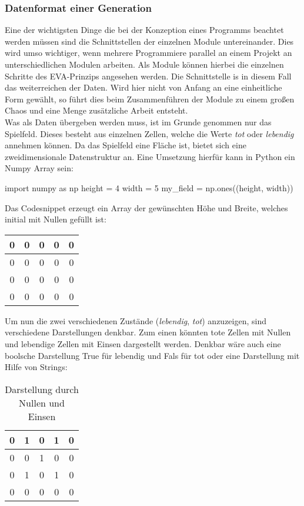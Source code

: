 \subsubsection{Datenformat einer Generation} \label{sec:Datenformat}
Eine der wichtigsten Dinge die bei der Konzeption eines Programms beachtet werden müssen sind die Schnittstellen der einzelnen Module untereinander. Dies wird umso wichtiger, wenn mehrere Programmiere parallel an einem Projekt an unterschiedlichen Modulen arbeiten. Als Module können hierbei die einzelnen Schritte des EVA-Prinzips angesehen werden. Die Schnittstelle is in diesem Fall das weiterreichen der Daten. Wird hier nicht von Anfang an eine einheitliche Form gewählt, so führt dies beim Zusammenführen der Module zu einem großen Chaos und eine Menge zusätzliche Arbeit entsteht.\\
Was als Daten übergeben werden muss, ist im Grunde genommen nur das Spielfeld. Dieses besteht aus einzelnen Zellen, welche die Werte \textit{tot} oder \textit{lebendig} annehmen können.  Da das Spielfeld eine Fläche ist, bietet sich eine zweidimensionale Datenstruktur an. Eine Umsetzung hierfür kann in Python ein Numpy Array sein:
\begin{python}
import numpy as np
height = 4
width = 5
my_field = np.ones((height, width))
\end{python}
Das Codesnippet erzeugt ein Array der gewünschten Höhe und Breite, welches initial mit Nullen gefüllt ist:
\begin{table}[H]
	\center
	\begin{tabular}{|c|c|c|c|c|}
		\hline
		0  & 0& 0 & 0 & 0 \\ \hline
		0  & 0& 0 & 0 & 0\\ \hline
		0  & 0& 0 & 0 & 0\\ \hline
		0  & 0& 0 & 0 & 0\\ \hline
	\end{tabular}
\end{table}
Um nun die zwei verschiedenen Zustände (\textit{lebendig}, \textit{tot}) anzuzeigen, sind verschiedene Darstellungen denkbar. Zum einen könnten tote Zellen mit Nullen und lebendige Zellen mit Einsen dargestellt werden. Denkbar wäre auch eine boolsche Darstellung True für lebendig und Fals für tot oder eine Darstellung mit Hilfe von Strings:\\


\begin{table}[H]
	\center
	\begin{tabular}{|c|c|c|c|c|}
	\hline
	0  & 1& 0 & 1 & 0 \\ \hline
	0  & 0& 1 & 0 & 0\\ \hline
	0  & 1& 0 & 1 & 0\\ \hline
	0  & 0& 0 & 0 & 0\\ \hline
	\end{tabular}
	\caption*{Darstellung durch Nullen und Einsen}
\end{table}

